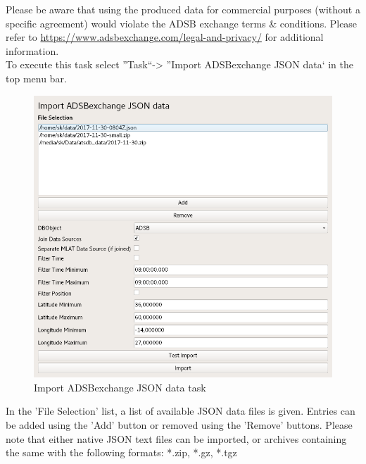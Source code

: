 Please be aware that using the produced data for commercial purposes (without a specific agreement) would violate the ADSB exchange terms \& conditions. Please refer to \url{https://www.adsbexchange.com/legal-and-privacy/} for additional information.\\

To execute this task select ''Task``->  ''Import ADSBexchange JSON data` in the top menu bar.

\begin{figure}[H]
  \center
    \includegraphics[width=14cm,frame]{../screenshots/adsbex_json_import.png}
  \caption{Import ADSBexchange JSON data task}
\end{figure}

In the 'File Selection' list, a list of available JSON data files is given. Entries can be added using the 'Add' button or removed using the 'Remove' buttons. Please note that either native JSON text files can be imported, or archives containing the same with the following formats: *.zip, *.gz, *.tgz \\

